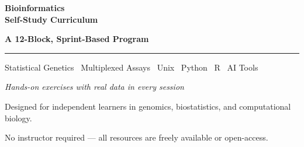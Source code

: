 \begin{titlepage}
\centering
\vspace*{3cm}

{\Huge\bfseries\color{navy} Bioinformatics\\[8pt] Self-Study Curriculum\par}

\vspace{1cm}
{\Large\color{teal}\bfseries A 12-Block, Sprint-Based Program\par}

\vspace{0.3cm}
\textcolor{slate}{\rule{0.6\textwidth}{0.5pt}}

\vspace{1cm}
{\large\color{slate} Statistical Genetics \textperiodcentered\ Multiplexed Assays \textperiodcentered\ Unix \textperiodcentered\ Python \textperiodcentered\ R \textperiodcentered\ AI Tools\par}

\vspace{0.5cm}
{\itshape\color{slate} Hands-on exercises with real data in every session\par}

\vfill

{\color{slate}\small Designed for independent learners in genomics, biostatistics, and computational biology.\par}
{\color{slate}\small No instructor required --- all resources are freely available or open-access.\par}

\end{titlepage}

